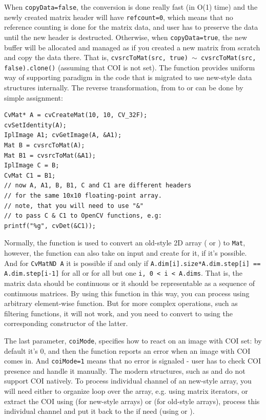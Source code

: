 When \texttt{copyData=false}, the conversion is done really fast (in O(1) time) and the newly created matrix header will have \texttt{refcount=0}, which means that no reference counting is done for the matrix data, and user has to preserve the data until the new header is destructed. Otherwise, when \texttt{copyData=true}, the new buffer will be allocated and managed as if you created a new matrix from scratch and copy the data there. That is,
\texttt{cvsrcToMat(src, true) $\sim$ cvsrcToMat(src, false).clone()} (assuming that COI is not set). The function provides uniform way of supporting  paradigm in the code that is migrated to use new-style data structures internally. The reverse transformation, from  to  or  can be done by simple assignment:

\begin{lstlisting}
CvMat* A = cvCreateMat(10, 10, CV_32F);
cvSetIdentity(A);
IplImage A1; cvGetImage(A, &A1);
Mat B = cvsrcToMat(A);
Mat B1 = cvsrcToMat(&A1);
IplImage C = B;
CvMat C1 = B1;
// now A, A1, B, B1, C and C1 are different headers
// for the same 10x10 floating-point array.
// note, that you will need to use "&"
// to pass C & C1 to OpenCV functions, e.g:
printf("%g", cvDet(&C1));
\end{lstlisting}

Normally, the function is used to convert an old-style 2D array ( or ) to \texttt{Mat}, however, the function can also take  on input and create  for it, if it's possible. And for \texttt{CvMatND A} it is possible if and only if \texttt{A.dim[i].size*A.dim.step[i] == A.dim.step[i-1]} for all or for all but one \texttt{i, 0 < i < A.dims}. That is, the matrix data should be continuous or it should be representable as a sequence of continuous matrices. By using this function in this way, you can process  using arbitrary element-wise function. But for more complex operations, such as filtering functions, it will not work, and you need to convert  to  using the corresponding constructor of the latter.

The last parameter, \texttt{coiMode}, specifies how to react on an image with COI set: by default it's 0, and then the function reports an error when an image with COI comes in. And \texttt{coiMode=1} means that no error is signaled - user has to check COI presence and handle it manually. The modern structures, such as  and  do not support COI natively. To process individual channel of an new-style array, you will need either to organize loop over the array, e.g. using matrix iterators, or extract the COI using  (for new-style arrays) or  (for old-style arrays), process this individual channel and put it back to the if need (using  or ).


